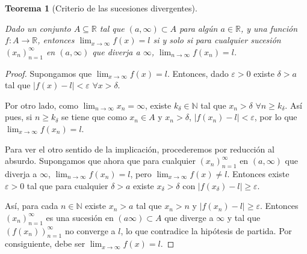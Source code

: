 \documentclass[
  a4paper,
]{scrreport}
\theoremstyle{definition}
\theoremstyle{plain}
\theoremstyle{definition}
\theoremstyle{definition}
\theoremstyle{plain}
\newtheorem{theorem}{Teorema}[chapter]
\theoremstyle{plain}
\theoremstyle{remark}
\begin{document}
\begin{theorem}[Criterio de las sucesiones
divergentes]\protect\hypertarget{thm-criterio-sucesiones-divergente}{}\label{thm-criterio-sucesiones-divergente}

Dado un conjunto \(A\subseteq \mathbb{R}\) tal que
\((a,\infty)\subset A\) para algún \(a\in\mathbb{R}\), y una función
\(f:A\to \mathbb{R}\), entonces \(\lim_{x\to\infty}f(x)=l\) si y solo si
para cualquier sucesión \((x_n)_{n=1}^\infty\) en \((a,\infty)\) que
diverja a \(\infty\), \(\lim_{n\to\infty}f(x_n)=l\).

\end{theorem}

\begin{tcolorbox}[enhanced jigsaw, leftrule=.75mm, colbacktitle=quarto-callout-note-color!10!white, toprule=.15mm, opacityback=0, opacitybacktitle=0.6, toptitle=1mm, breakable, bottomtitle=1mm, colframe=quarto-callout-note-color-frame, rightrule=.15mm, titlerule=0mm, title=\textcolor{quarto-callout-note-color}{\faInfo}\hspace{0.5em}{Demostración}, arc=.35mm, left=2mm, bottomrule=.15mm, colback=white, coltitle=black]

\begin{proof}
Supongamos que \(\lim_{x\to\infty}f(x)=l\). Entonces, dado
\(\varepsilon>0\) existe \(\delta>a\) tal que \(|f(x)-l|<\varepsilon\)
\(\forall x>\delta\).

Por otro lado, como \(\lim_{n\to\infty}x_n=\infty\), existe
\(k_\delta\in\mathbb{N}\) tal que \(x_n>\delta\)
\(\forall n\geq k_\delta\). Así pues, si \(n\geq k_\delta\) se tiene que
como \(x_n\in A\) y \(x_n>\delta\), \(|f(x_n)-l|<\varepsilon\), por lo
que \(\lim_{x\to\infty}f(x_n)=l\).

Para ver el otro sentido de la implicación, procederemos por reducción
al absurdo. Supongamos que ahora que para cualquier
\((x_n)_{n=1}^\infty\) en \((a,\infty)\) que diverja a \(\infty\),
\(\lim_{n\to\infty}f(x_n)=l\), pero \(\lim_{x\to\infty}f(x)\neq l\).
Entonces existe \(\varepsilon>0\) tal que para cualquier \(\delta>a\)
existe \(x_\delta>\delta\) con \(|f(x_\delta)-l|\geq \varepsilon\).

Así, para cada \(n\in\mathbb{N}\) existe \(x_n>a\) tal que \(x_n>n\) y
\(|f(x_n)-l|\geq \varepsilon\). Entonces \((x_n)_{n=1}^\infty\) es una
sucesión en \((a\infty)\subset A\) que diverge a \(\infty\) y tal que
\((f(x_n))_{n=1}^\infty\) no converge a \(l\), lo que contradice la
hipótesis de partida. Por consiguiente, debe ser
\(\lim_{x\to\infty}f(x)=l\).
\end{proof}

\end{tcolorbox}
\end{document}
